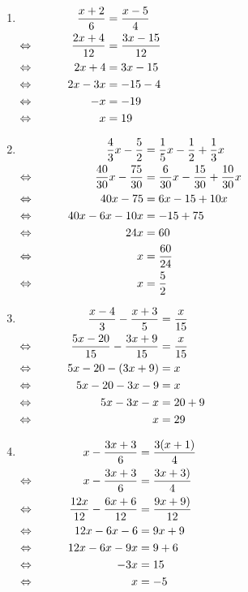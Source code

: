 \documentclass{bis}
\begin{document}
\begin{solution}
\begin{enumerate}
\item $\begin{aligned}[t]
     && \dfrac{x+2}{6}&=\dfrac{x-5}{4}\\
\Leftrightarrow\mkern40mu && \dfrac{2x+4}{12}&=\dfrac{3x-15}{12}\\
\Leftrightarrow\mkern40mu && 2x + 4	&= 3x - 15\\
\Leftrightarrow\mkern40mu && 2x - 3x	&= - 15 - 4\\
\Leftrightarrow\mkern40mu && - x	&= - 19\\
\Leftrightarrow\mkern40mu && x	&= 19\\
\end{aligned}$
\item $\begin{aligned}[t]
     && \dfrac{4}{3}x-\dfrac{5}{2}&=\dfrac{1}{5}x-\dfrac{1}{2}+\dfrac{1}{3}x\\
\Leftrightarrow\mkern40mu && \dfrac{40}{30}x-\dfrac{75}{30}&=\dfrac{6}{30}x-\dfrac{15}{30}+\dfrac{10}{30}x\\
\Leftrightarrow\mkern40mu && 40x - 75	&= 6x - 15 + 10x\\
\Leftrightarrow\mkern40mu && 40x - 6x - 10x	&= - 15 + 75\\
\Leftrightarrow\mkern40mu && 24x	&= 60\\
\Leftrightarrow\mkern40mu && x	&= \dfrac{60}{24}\\
\Leftrightarrow\mkern40mu && x	&= \dfrac{5}{2}\\
\end{aligned}$
\item $\begin{aligned}[t]
     && \dfrac{x-4}{3}-\dfrac{x+3}{5}&=\dfrac{x}{15}\\
\Leftrightarrow\mkern40mu && \dfrac{5x-20}{15}-\dfrac{3x+9}{15}&=\dfrac{x}{15}\\
\Leftrightarrow\mkern40mu && 5x - 20 - (3x + 9)	&= x\\
\Leftrightarrow\mkern40mu && 5x - 20 - 3x - 9	&= x\\
\Leftrightarrow\mkern40mu && 5x - 3x - x	&= 20 + 9\\
\Leftrightarrow\mkern40mu && x	&= 29\\
\end{aligned}$
\item $\begin{aligned}[t]
     && x-\dfrac{3x+3}{6}&=\dfrac{3(x+1)}{4}\\
\Leftrightarrow\mkern40mu && x-\dfrac{3x+3}{6}&=\dfrac{3x+3)}{4}\\
\Leftrightarrow\mkern40mu && \dfrac{12x}{12}-\dfrac{6x+6}{12}&=\dfrac{9x+9)}{12}\\
\Leftrightarrow\mkern40mu && 12x - 6x - 6	&= 9x + 9\\
\Leftrightarrow\mkern40mu && 12x - 6x - 9x	&= 9 + 6\\
\Leftrightarrow\mkern40mu && - 3x	&= 15\\
\Leftrightarrow\mkern40mu && x	&= - 5\\
\end{aligned}$
\end{enumerate}
\end{solution}
\end{document}
